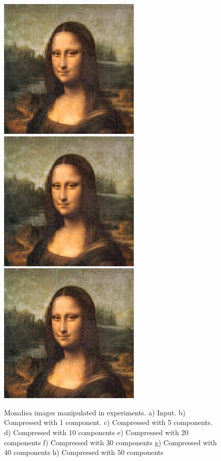 \documentclass[]{IEEEtran}
\begin{document}
\begin{figure}[h]
  \includegraphics[width=0.4\hsize]{../output/monalisa_30.png}
  \includegraphics[width=0.4\hsize]{../output/monalisa_40.png}
  \includegraphics[width=0.4\hsize]{../output/monalisa_50.png}
  \caption{Monalisa images manipulated in experiments. a) Input. b) Compressed with 1 component. c) Compressed with 5 components. d) Compressed with 10 components e) Compressed with 20 components f) Compressed with 30 components g) Compressed with 40 components h) Compressed with 50 components}
  \label{fig:effect-monalisa}
\end{figure}
\end{document}
